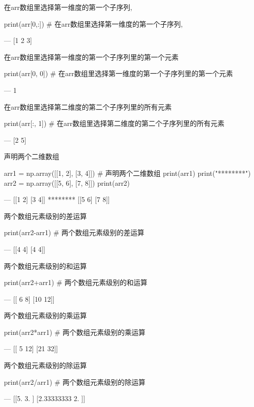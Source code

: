 在arr数组里选择第一维度的第一个子序列, 

\begin{python}
print(arr[0,:])            # 在arr数组里选择第一维度的第一个子序列, 

---
[1 2 3]
\end{python}

在arr数组里选择第一维度的第一个子序列里的第一个元素

\begin{python}
print(arr[0, 0])           # 在arr数组里选择第一维度的第一个子序列里的第一个元素

---
1
\end{python}

在arr数组里选择第二维度的第二个子序列里的所有元素

\begin{python}
print(arr[:, 1])           # 在arr数组里选择第二维度的第二个子序列里的所有元素

---
[2 5]
\end{python}

声明两个二维数组

\begin{python}
arr1 = np.array([[1, 2], [3, 4]])     # 声明两个二维数组
print(arr1)
print("********")
arr2 = np.array([[5, 6], [7, 8]])
print(arr2)

---
[[1 2]
 [3 4]]
********
[[5 6]
 [7 8]]
\end{python}

两个数组元素级别的差运算

\begin{python}
print(arr2-arr1)     # 两个数组元素级别的差运算

---
[[4 4]
 [4 4]]
\end{python}

两个数组元素级别的和运算

\begin{python}
print(arr2+arr1)     # 两个数组元素级别的和运算

---
[[ 6  8]
 [10 12]]
\end{python}

两个数组元素级别的乘运算

\begin{python}
print(arr2*arr1)     # 两个数组元素级别的乘运算

---
[[ 5 12]
 [21 32]]
\end{python}

两个数组元素级别的除运算

\begin{python}
print(arr2/arr1)     # 两个数组元素级别的除运算

---
[[5.         3.        ]
 [2.33333333 2.        ]]
\end{python}

